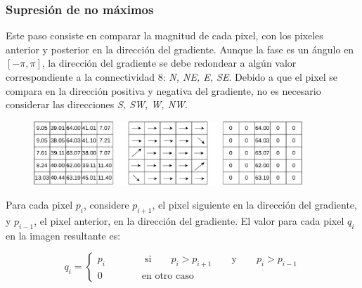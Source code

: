 \begin{frame}\frametitle{Supresión de no máximos}
  Este paso consiste en comparar la magnitud de cada pixel, con los pixeles anterior y posterior en la dirección del gradiente.
  Aunque la fase es un ángulo en $[-\pi, \pi]$, la dirección del gradiente se debe redondear a algún valor correspondiente a la connectividad 8: \textit{N, NE, E, SE}. Debido a que el pixel se compara en la dirección positiva y negativa del gradiente, no es necesario considerar las direcciones \textit{S, SW, W, NW}.
  \begin{figure}
    \centering
    \includegraphics[width=0.9\textwidth]{Figuras/SobelMA.pdf}
  \end{figure}
  Para cada pixel $p_i$, considere $p_{i+1}$, el pixel siguiente en la dirección del gradiente, y $p_{i-1}$, el pixel anterior, en la dirección del gradiente. El valor para cada pixel $q_i$ en la imagen resultante es:
  
  \[q_i = \begin{cases}p_i\qquad\qquad\textrm{si}\qquad p_i > p_{i+1} \qquad\textrm{y}\qquad p_i > p_{i-1}\\
  0\qquad\qquad\textrm{en otro caso}\end{cases}\]
\end{frame}

